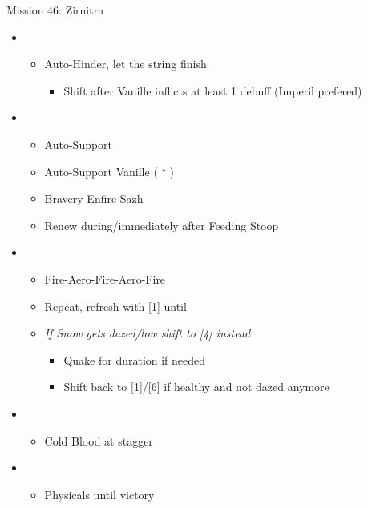 \begin{battle}{Mission 46: Zirnitra}
	\begin{itemize}
		\item \second
			\begin{itemize}
				\item Auto-Hinder, let the string finish
					\begin{itemize}
						\item Shift after Vanille inflicts at least 1 debuff (Imperil prefered)
					\end{itemize}
			\end{itemize}
		\item \third
			\begin{itemize}
				\item Auto-Support
				\item Auto-Support Vanille ($\uparrow$)
				\item Bravery-Enfire Sazh
				\item Renew during/immediately after Feeding Stoop
			\end{itemize}
		\item \first
			\begin{itemize}
				\item Fire-Aero-Fire-Aero-Fire
				\item Repeat, refresh with [1] until \stagger
				\item \textit{If Snow gets dazed/low shift to [4] instead}
					\begin{itemize}
						\item Quake for duration if needed
						\item Shift back to [1]/[6] if healthy and not dazed anymore
					\end{itemize}
			\end{itemize}
		\item \fifth
			\begin{itemize}
				\item Cold Blood at stagger
			\end{itemize}
		\item \fourth
			\begin{itemize}
				\item Physicals until victory
			\end{itemize}																			
	\end{itemize}
\end{battle}

